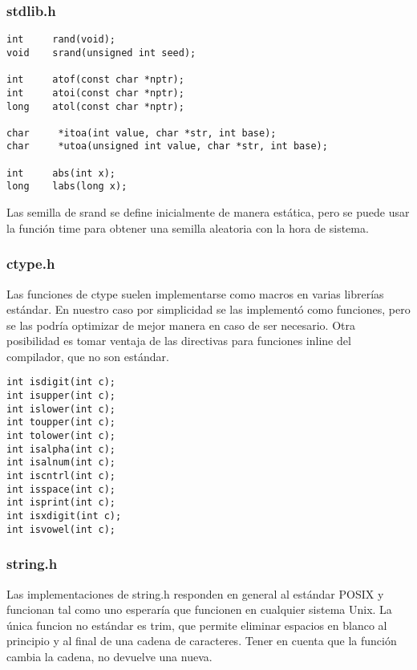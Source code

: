 \documentclass[11pt]{article}
\begin{document}
\subsubsection{stdlib.h}

\begin{lstlisting}
int     rand(void);
void    srand(unsigned int seed);

int     atof(const char *nptr);
int     atoi(const char *nptr);
long    atol(const char *nptr);

char     *itoa(int value, char *str, int base);
char     *utoa(unsigned int value, char *str, int base);

int     abs(int x);
long    labs(long x);
\end{lstlisting}

Las semilla de srand se define inicialmente de manera estática, pero se puede usar la función time para obtener una semilla aleatoria con la hora de sistema.


\subsubsection{ctype.h}

Las funciones de ctype suelen implementarse como macros en varias librerías estándar. En nuestro caso por simplicidad se las implementó como funciones, pero se las podría optimizar de mejor manera en caso de ser necesario. Otra posibilidad es tomar ventaja de las directivas para funciones inline del compilador, que no son estándar.

\begin{lstlisting}
int isdigit(int c);
int isupper(int c);
int islower(int c);
int toupper(int c);
int tolower(int c);
int isalpha(int c);
int isalnum(int c);
int iscntrl(int c);
int isspace(int c);
int isprint(int c);
int isxdigit(int c);
int isvowel(int c);
\end{lstlisting}

\subsubsection{string.h}

Las implementaciones de string.h responden en general al estándar POSIX y funcionan tal como uno esperaría que funcionen en cualquier sistema Unix. La única funcion no estándar es trim, que permite eliminar espacios en blanco al principio y al final de una cadena de caracteres. Tener en cuenta que la función cambia la cadena, no devuelve una nueva.
\end{document}

